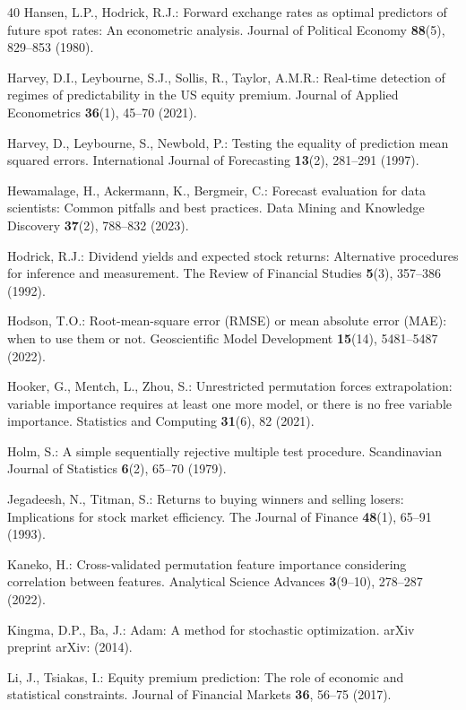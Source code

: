 \documentclass[runningheads,orivec]{llncs}
\begin{document}
\begin{thebibliography}{40}
Hansen, L.P., Hodrick, R.J.: Forward exchange rates as optimal predictors of future spot rates: An econometric analysis. Journal of Political Economy \textbf{88}(5), 829--853 (1980).

Harvey, D.I., Leybourne, S.J., Sollis, R., Taylor, A.M.R.: Real-time detection of regimes of predictability in the US equity premium. Journal of Applied Econometrics \textbf{36}(1), 45--70 (2021).

Harvey, D., Leybourne, S., Newbold, P.: Testing the equality of prediction mean squared errors. International Journal of Forecasting \textbf{13}(2), 281--291 (1997).

Hewamalage, H., Ackermann, K., Bergmeir, C.: Forecast evaluation for data scientists: Common pitfalls and best practices. Data Mining and Knowledge Discovery \textbf{37}(2), 788--832 (2023).

Hodrick, R.J.: Dividend yields and expected stock returns: Alternative procedures for inference and measurement. The Review of Financial Studies \textbf{5}(3), 357--386 (1992).

Hodson, T.O.: Root-mean-square error (RMSE) or mean absolute error (MAE): when to use them or not. Geoscientific Model Development \textbf{15}(14), 5481--5487 (2022).

Hooker, G., Mentch, L., Zhou, S.: Unrestricted permutation forces extrapolation: variable importance requires at least one more model, or there is no free variable importance. Statistics and Computing \textbf{31}(6), 82 (2021).

Holm, S.: A simple sequentially rejective multiple test procedure. Scandinavian Journal of Statistics \textbf{6}(2), 65--70 (1979).

Jegadeesh, N., Titman, S.: Returns to buying winners and selling losers: Implications for stock market efficiency. The Journal of Finance \textbf{48}(1), 65--91 (1993).

Kaneko, H.: Cross-validated permutation feature importance considering correlation between features. Analytical Science Advances \textbf{3}(9--10), 278--287 (2022).

Kingma, D.P., Ba, J.: Adam: A method for stochastic optimization. arXiv preprint arXiv: (2014).

Li, J., Tsiakas, I.: Equity premium prediction: The role of economic and statistical constraints. Journal of Financial Markets \textbf{36}, 56--75 (2017).


\end{thebibliography}
\end{document}
